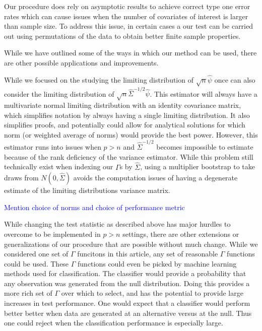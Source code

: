 \documentclass{article}
\begin{document}
Our procedure does rely on asymptotic results to achieve correct type one error rates which can cause issues when the number of covariates of interest is larger than sample size. To address this issue, in certain cases a our test can be carried out using permutations of the data to obtain better finite sample properties. 

While we have outlined some of the ways in which our method can be used, there are other possible applications and improvements. 

While we focused on the studying the limiting distribution of $\sqrt{n}\hat{\psi}$ once can also consider the limiting distribution of $\sqrt{n}\hat{\Sigma}^{-1/2}\hat{\psi}$.  This estimator will always have a multivariate normal limiting distribution with an identity covariance matrix, which simplifies notation by always having a single limiting distribution.  It also simplifies proofs, and potentially could allow for analytical solutions for which norm (or weighted average of norms) would provide the best power.  However, this estimator runs into issues when $p > n$ and $\hat{\Sigma}^{-1/2}$ becomes impossible to estimate because of the rank deficiency of the variance estimator.  While this problem still technically exist when indexing our $\Gamma$s by $\hat{\Sigma}$, using a multiplier bootstrap to take draws from $N(0, \hat{\Sigma})$ avoids the computation issues of having a degenerate estimate of the limiting distributions variance matrix.

\textcolor{blue}{Mention choice of norms and choice of performance metric}

While changing the test statistic as described above has major hurdles to overcome to be implemented in $p > n$ settings, there are other extensions or generalizations of our procedure that are possible without much change.  While we considered one set of $\Gamma$ funcitons in this article, any set of reasonable $\Gamma$ functions could be used.  These $\Gamma$ functions could even be picked by machine learning methods used for classification.  The classifier would provide a probability that any observation was generated from the null distribution.  Doing this provides a more rich set of $\Gamma$ over which to select, and has the potential to provide large increases in test performance.  One would expect that a classifier would perform better better when data are generated at an alternative versus at the null.  Thus one could reject when the classification performance is especially large.  
\end{document}
